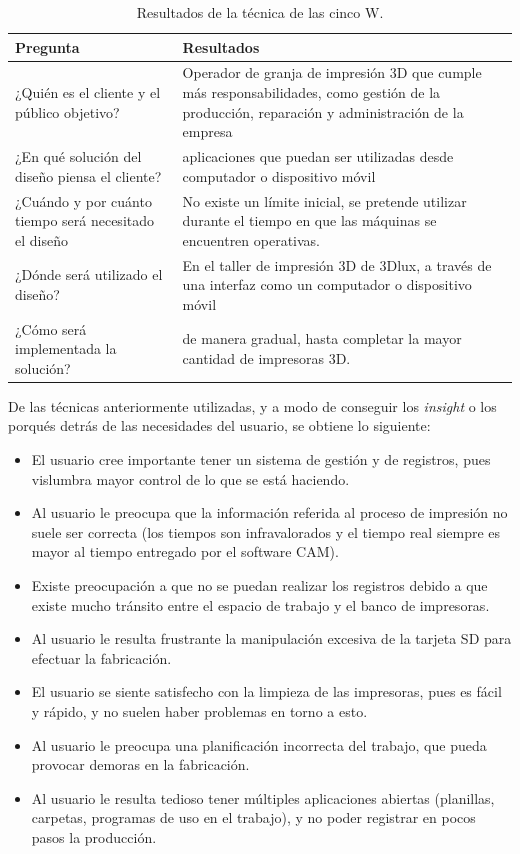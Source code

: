\begin{table}[H]
\centering
\begin{tabular}{|p{5cm}|p{5cm}|}
\hline
Pregunta & Resultados \\
\hline
¿Quién es el cliente y el público objetivo? &  Operador de granja de impresión 3D que cumple más responsabilidades, como gestión de la producción, reparación y administración de la empresa\\
\hline
¿En qué solución del diseño piensa el cliente? & aplicaciones que puedan ser utilizadas desde computador o dispositivo móvil \\
\hline
¿Cuándo y por cuánto tiempo será necesitado el diseño & No existe un límite inicial, se pretende utilizar durante el tiempo en que las máquinas se encuentren operativas.\\
\hline
¿Dónde será utilizado el diseño? & En el taller de impresión 3D de 3Dlux, a través de una interfaz como un computador o dispositivo móvil \\
\hline
¿Cómo será implementada la solución? & de manera gradual, hasta completar la mayor cantidad de impresoras 3D.\\
\hline
\end{tabular}
\caption{Resultados de la técnica de las cinco W.}
\end{table}



De las técnicas anteriormente utilizadas, y a modo de conseguir los \textit{insight} o los porqués detrás de las necesidades del usuario, se obtiene lo siguiente:

\begin{itemize}
\item El usuario cree importante tener un sistema de gestión y de registros, pues vislumbra mayor control de lo que se está haciendo.
\item Al usuario le preocupa que la información referida al proceso de impresión no suele ser correcta (los tiempos son infravalorados y el tiempo real siempre es mayor al tiempo entregado por el software CAM).
\item Existe preocupación a que no se puedan realizar los registros debido a que existe mucho tránsito entre el espacio de trabajo y el banco de impresoras.
\item Al usuario le resulta frustrante la manipulación excesiva de la tarjeta SD para efectuar la fabricación. 
\item El usuario se siente satisfecho con la limpieza de las impresoras, pues es fácil y rápido, y no suelen haber problemas en torno a esto.
\item Al usuario le preocupa una planificación incorrecta del trabajo, que pueda provocar demoras en la fabricación.
\item Al usuario le resulta tedioso tener múltiples aplicaciones abiertas (planillas, carpetas, programas de uso en el trabajo), y no poder registrar en pocos pasos la producción.
\end{itemize}




